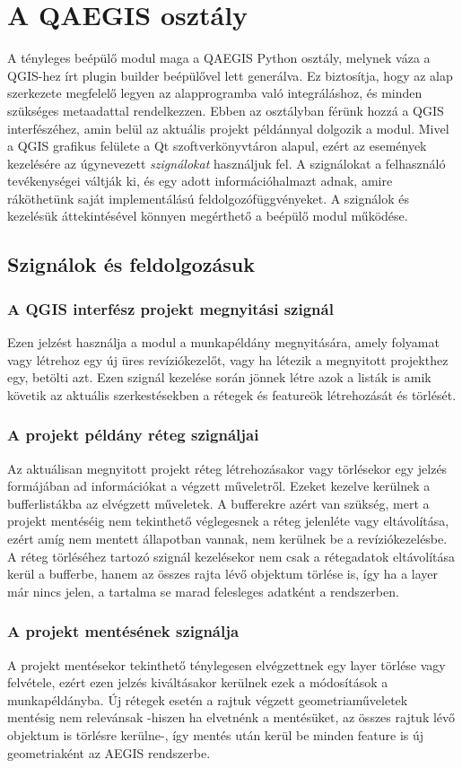 \section{A QAEGIS osztály}
A tényleges beépülő modul maga a QAEGIS Python osztály, melynek váza a QGIS-hez írt plugin builder beépülővel lett generálva. Ez biztosítja, hogy az alap szerkezete megfelelő legyen az alapprogramba való integráláshoz, és minden szükséges metaadattal rendelkezzen. Ebben az osztályban férünk hozzá a QGIS interfészéhez, amin belül az aktuális projekt példánnyal dolgozik a modul. Mivel a QGIS grafikus felülete a Qt szoftverkönyvtáron alapul, ezért az események kezelésére az úgynevezett \emph{szignálokat} használjuk fel. A szignálokat a felhasználó tevékenységei váltják ki, és egy adott információhalmazt adnak, amire ráköthetünk saját implementálású feldolgozófüggvényeket. A szignálok és kezelésük áttekintésével könnyen megérthető a beépülő modul működése.
\subsection{Szignálok és feldolgozásuk}
\subsubsection{A QGIS interfész projekt megnyitási szignál}
Ezen jelzést használja a modul a munkapéldány megnyitására, amely folyamat vagy létrehoz egy új üres revíziókezelőt, vagy ha létezik a megnyitott projekthez egy, betölti azt. Ezen szignál kezelése során jönnek létre azok a listák is amik követik az aktuális szerkestésekben a rétegek és featureök létrehozását és törlését.
\subsubsection{A projekt példány réteg szignáljai}
Az aktuálisan megnyitott projekt réteg létrehozásakor vagy törlésekor egy jelzés formájában ad információkat a végzett műveletről. Ezeket kezelve kerülnek a bufferlistákba az elvégzett műveletek. A bufferekre azért van szükség, mert a projekt mentéséig nem tekinthető véglegesnek a réteg jelenléte vagy eltávolítása, ezért amíg nem mentett állapotban vannak, nem kerülnek be a revíziókezelésbe. A réteg törléséhez tartozó szignál kezelésekor nem csak a rétegadatok eltávolítása kerül a bufferbe, hanem az összes rajta lévő objektum törlése is, így ha a layer már nincs jelen, a tartalma se marad felesleges adatként a rendszerben.
\subsubsection{A projekt mentésének szignálja}
A projekt mentésekor tekinthető ténylegesen elvégzettnek egy layer törlése vagy felvétele, ezért ezen jelzés kiváltásakor kerülnek ezek a módosítások a munkapéldányba. Új rétegek esetén a rajtuk végzett geometriaműveletek mentésig nem relevánsak -hiszen ha elvetnénk a mentésüket, az összes rajtuk lévő objektum is törlésre kerülne-, így mentés után kerül be minden feature is új geometriaként az AEGIS rendszerbe.
